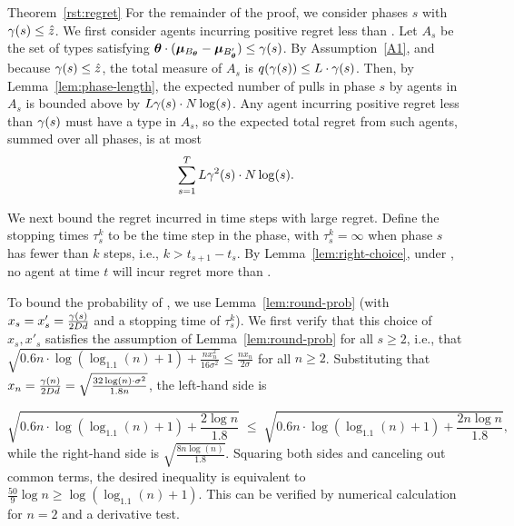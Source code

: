 \begin{emptyextraproof}{Theorem~\ref{rst:regret}}
For the remainder of the proof, we consider phases $s$
with $\EarlyCut{s} \leq \TieCutoff$.
We first consider agents \AgV incurring positive regret less than .
Let $A_s$ be the set of types satisfying 
$\AgV \cdot (\ArmV{\Best{\AgV}} - \ArmV{\Second{\AgV}}) \leq \EarlyCut{s}$.
By Assumption~\ref{A1}, and because $\EarlyCut{s} \leq \TieCutoff$,
the total measure of $A_s$
is $\AlmostTied{\EarlyCut{s}} \leq \TieDensity \cdot \EarlyCut{s}$.
Then, by Lemma~\ref{lem:phase-length},
the expected number of pulls in phase $s$ by agents in $A_s$  
is bounded above by $\TieDensity \EarlyCut{s} \cdot \ARMNUM \log(s)$.
Any agent \AgV incurring positive regret less than $\EarlyCut{s}$
must have a type in $A_s$,
so the expected total regret from such agents,
summed over all phases, is at most
\begin{equation}
\sum_{s=1}^{T} \TieDensity \EarlyCut[2]{s} \cdot \ARMNUM \log(s).
\label{equ:small_regret_bound}
\end{equation}

We next bound the regret incurred in time steps with large regret.
Define the stopping times $\tau_{s}^{k}$ to be the 
time step in the  phase,
with $\tau_{s}^{k} = \infty$ when phase $s$ has fewer than $k$ steps,
i.e., $k > t_{s+1}-t_{s}$.
By Lemma~\ref{lem:right-choice},
under ,
no agent at time $t$ will incur regret more than .
  
To bound the probability of ,
we use Lemma~\ref{lem:round-prob}
(with $x_s = x'_s = \frac{\EarlyCut{s}}{2 \Diam d}$
and a stopping time of $\tau_s^k$).
We first verify that this choice of $x_s, x'_s$
satisfies the assumption of Lemma~\ref{lem:round-prob} for all
$s \geq 2$,
i.e., that
$\sqrt{0.6 n \cdot \log (\log_{1.1}(n) + 1) + \frac{n x_n^2}{16 \sigma^2}}
\leq \frac{n x_n}{2 \sigma}$
for all $n \geq 2$.
Substituting that
$x_n = \frac{\EarlyCut{n}}{2 \Diam d} = \sqrt{\frac{32\log(n) \cdot \sigma^2}{1.8 n}}$,
the left-hand side is

\[
  \sqrt{0.6 n \cdot \log (\log_{1.1}(n) + 1) + \frac{2 \log n}{1.8}}
  \; \leq \;
  \sqrt{0.6 n \cdot \log (\log_{1.1}(n) + 1) + \frac{2 n \log n}{1.8}},
\]
while the right-hand side is $\sqrt{\frac{8 n \log(n)}{1.8}}$.
Squaring both sides and canceling out common terms,
the desired inequality is equivalent to
$\frac{50}{9} \log n \geq \log(\log_{1.1}(n) + 1)$.
This can be verified by numerical calculation for $n=2$ and a
derivative test.


\end{emptyextraproof}
